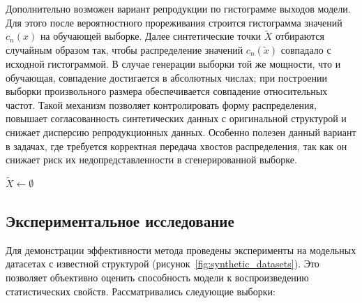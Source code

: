 Дополнительно возможен вариант репродукции по гистограмме выходов модели. Для этого после вероятностного прореживания строится гистограмма значений \(c_n(x)\) на обучающей выборке. Далее синтетические точки \(\tilde{X}\) отбираются случайным образом так, чтобы распределение значений \(c_n(\tilde{x})\) совпадало с исходной гистограммой. В случае генерации выборки той же мощности, что и обучающая, совпадение достигается в абсолютных числах; при построении выборки произвольного размера обеспечивается совпадение относительных частот. Такой механизм позволяет контролировать форму распределения, повышает согласованность синтетических данных с оригинальной структурой и снижает дисперсию репродукционных данных. Особенно полезен данный вариант в задачах, где требуется корректная передача хвостов распределения, так как он снижает риск их недопредставленности в сгенерированной выборке.


\begin{algorithm}
\DontPrintSemicolon
\SetAlgoVlined
{}
\caption{Создание синтетических табличных данных}
\label{alg:synthetic-data-generation}
\BlankLine
{}
\BlankLine

$\tilde{X} \leftarrow \emptyset$\;
\BlankLine
{}
\end{algorithm}


\subsection{Экспериментальное исследование}

Для демонстрации эффективности метода проведены эксперименты на модельных датасетах с известной структурой (рисунок~\cref{fig:synthetic_datasets}). Это позволяет объективно оценить способность модели к воспроизведению статистических свойств. Рассматривались следующие выборки:

